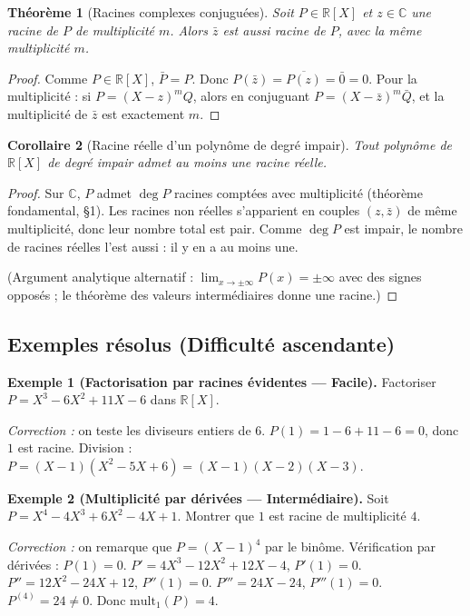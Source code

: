 \documentclass[12pt,a4paper]{report}
\newtheorem{theoreme}{Théorème}[section]
\newtheorem{corollaire}[theoreme]{Corollaire}
\theoremstyle{definition}
\theoremstyle{remark}
\begin{document}
\begin{theoreme}[Racines complexes conjuguées]
Soit $P \in \mathbb{R}[X]$ et $z \in \mathbb{C}$ une racine de $P$ de multiplicité $m$. Alors $\bar{z}$ est aussi racine de $P$, avec la même multiplicité $m$.
\end{theoreme}

\begin{proof}
Comme $P \in \mathbb{R}[X]$, $\bar{P} = P$. Donc $P(\bar{z}) = \overline{P(z)} = \bar{0} = 0$. Pour la multiplicité : si $P = (X - z)^m Q$, alors en conjuguant $P = (X - \bar{z})^m \bar{Q}$, et la multiplicité de $\bar{z}$ est exactement $m$.
\end{proof}

\begin{corollaire}[Racine réelle d'un polynôme de degré impair]
Tout polynôme de $\mathbb{R}[X]$ de degré impair admet au moins une racine réelle.
\end{corollaire}

\begin{proof}
Sur $\mathbb{C}$, $P$ admet $\deg P$ racines comptées avec multiplicité (théorème fondamental, §1). Les racines non réelles s'apparient en couples $(z, \bar{z})$ de même multiplicité, donc leur nombre total est pair. Comme $\deg P$ est impair, le nombre de racines réelles l'est aussi : il y en a au moins une.

(Argument analytique alternatif : $\lim_{x \to \pm\infty} P(x) = \pm \infty$ avec des signes opposés ; le théorème des valeurs intermédiaires donne une racine.)
\end{proof}

\subsection{Exemples résolus (Difficulté ascendante)}

\textbf{Exemple 1 (Factorisation par racines évidentes --- Facile).}
Factoriser $P = X^3 - 6X^2 + 11X - 6$ dans $\mathbb{R}[X]$.

\textit{Correction :} on teste les diviseurs entiers de $6$. $P(1) = 1 - 6 + 11 - 6 = 0$, donc $1$ est racine. Division : $P = (X - 1)(X^2 - 5X + 6) = (X - 1)(X - 2)(X - 3)$.

\medskip

\textbf{Exemple 2 (Multiplicité par dérivées --- Intermédiaire).}
Soit $P = X^4 - 4X^3 + 6X^2 - 4X + 1$. Montrer que $1$ est racine de multiplicité $4$.

\textit{Correction :} on remarque que $P = (X - 1)^4$ par le binôme. Vérification par dérivées :
$P(1) = 0$. $P' = 4X^3 - 12X^2 + 12X - 4$, $P'(1) = 0$. $P'' = 12X^2 - 24X + 12$, $P''(1) = 0$. $P''' = 24X - 24$, $P'''(1) = 0$. $P^{(4)} = 24 \neq 0$. Donc $\mathrm{mult}_1(P) = 4$. \checkmark
\end{document}
